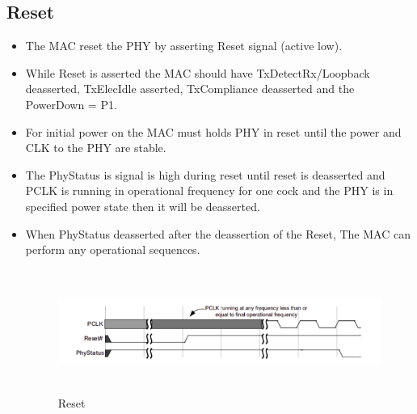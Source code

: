  \subsection{Reset}
\begin{itemize}
    \item The MAC reset the PHY by asserting Reset signal (active low). 
    \item While Reset is asserted the MAC should have TxDetectRx/Loopback deasserted, TxElecIdle asserted, TxCompliance deasserted and the PowerDown = P1.
    \item For initial power on the MAC must holds PHY in reset until the power and CLK to the PHY are stable.
    \item The PhyStatus is signal is high during reset until reset is deasserted and PCLK is running in operational frequency for one cock and the PHY is in specified power state then it will be deasserted.
    \item When PhyStatus deasserted after the deassertion of the Reset, The MAC can perform any operational sequences.

\begin{figure}[H]
  \centering
  \includegraphics[width=160mm,height=40mm]{images/clk_diagram/reset.png}
  \caption{Reset}
  \label{lane}
\end{figure}
\end{itemize}
